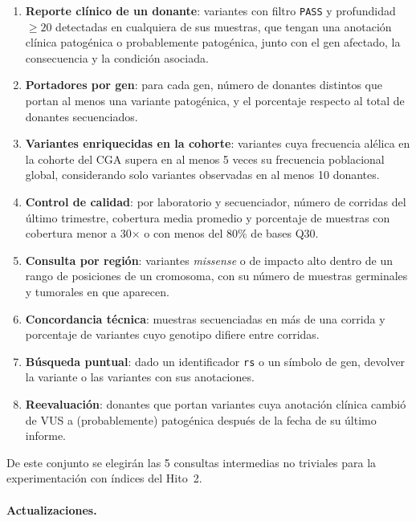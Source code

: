 \documentclass[11pt,a4paper]{article}
\newcommand{\tb}[1]{\texttt{#1}}
\begin{document}
\begin{enumerate}[label=\textbf{C\arabic*.}]
  \item \textbf{Reporte clínico de un donante}: variantes con filtro \tb{PASS} y profundidad $\geq 20$ detectadas en cualquiera de sus muestras, que tengan una anotación clínica patogénica o probablemente patogénica, junto con el gen afectado, la consecuencia y la condición asociada.
  \item \textbf{Portadores por gen}: para cada gen, número de donantes distintos que portan al menos una variante patogénica, y el porcentaje respecto al total de donantes secuenciados.
  \item \textbf{Variantes enriquecidas en la cohorte}: variantes cuya frecuencia alélica en la cohorte del CGA supera en al menos 5 veces su frecuencia poblacional global, considerando solo variantes observadas en al menos 10 donantes.
  \item \textbf{Control de calidad}: por laboratorio y secuenciador, número de corridas del último trimestre, cobertura media promedio y porcentaje de muestras con cobertura menor a 30$\times$ o con menos del 80\% de bases Q30.
  \item \textbf{Consulta por región}: variantes \emph{missense} o de impacto alto dentro de un rango de posiciones de un cromosoma, con su número de muestras germinales y tumorales en que aparecen.
  \item \textbf{Concordancia técnica}: muestras secuenciadas en más de una corrida y porcentaje de variantes cuyo genotipo difiere entre corridas.
  \item \textbf{Búsqueda puntual}: dado un identificador \tb{rs} o un símbolo de gen, devolver la variante o las variantes con sus anotaciones.
  \item \textbf{Reevaluación}: donantes que portan variantes cuya anotación clínica cambió de VUS a (probablemente) patogénica después de la fecha de su último informe.
\end{enumerate}

De este conjunto se elegirán las 5 consultas intermedias no triviales para la experimentación con índices del Hito~2.

\paragraph{Actualizaciones.}
\end{document}
